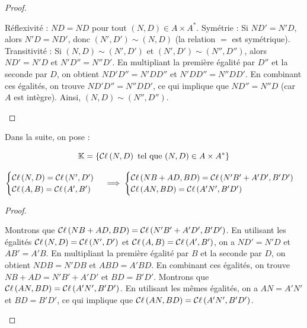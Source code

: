 \documentclass[12pt, a4paper]{report}
\begin{document}
\begin{proof}
    \begin{outline}
        \1 Réflexivité : $ND = ND$ pour tout $(N, D) \in A \times A^*$.
        \1 Symétrie : Si $ND' = N'D$, alors $N'D = ND'$, donc $(N', D') \sim (N, D)$ (la relation $=$ est symétrique).
        \1 Transitivité :
        \2 Si $(N, D) \sim (N', D')$ et $(N', D') \sim (N'', D'')$, alors $ND' = N'D$ et $N'D'' = N''D'$.
        \2 En multipliant la première égalité par $D''$ et la seconde par $D$, on obtient $ND'D'' = N'DD''$ et $N'DD'' = N''DD'$.
        \2 En combinant ces égalités, on trouve $ND'D'' = N''DD'$, ce qui implique que $ND'' = N''D$ (car $A$ est intègre).
        \2 Ainsi, $(N, D) \sim (N'', D'')$.
    \end{outline}
\end{proof}

\begin{definition}
    Dans la suite, on pose :

    $$\mathbb{K} = \{ \mathcal{C}\ell\left(N, D\right) \text{ tel que } (N, D) \in A \times A^* \}$$
\end{definition}

\begin{property}
    $$\begin{cases}
    \mathcal{C}\ell\left(N,D\right) = \mathcal{C}\ell\left(N', D'\right)\\
    \mathcal{C}\ell\left(A,B\right) = \mathcal{C}\ell\left(A', B'\right)
    \end{cases}
    \implies
    \begin{cases}
    \mathcal{C}\ell\left(NB + AD, BD\right) = \mathcal{C}\ell\left(N'B' + A'D', B'D'\right)\\
    \mathcal{C}\ell\left(AN,BD\right) = \mathcal{C}\ell\left(A'N', B'D'\right)
    \end{cases}$$
\end{property}

\begin{proof}
    \begin{outline}
        \1 Montrons que $\mathcal{C}\ell\left(NB + AD, BD\right) = \mathcal{C}\ell\left(N'B' + A'D', B'D'\right)$.
        \2 En utilisant les égalités $\mathcal{C}\ell\left(N,D\right) = \mathcal{C}\ell\left(N', D'\right)$ et $\mathcal{C}\ell\left(A,B\right) = \mathcal{C}\ell\left(A', B'\right)$, on a $ND' = N'D$ et $AB' = A'B$.
        \2 En multipliant la première égalité par $B$ et la seconde par $D$, on obtient $NDB = N'DB$ et $ABD = A'BD$.
        \2 En combinant ces égalités, on trouve $NB + AD = N'B' + A'D'$ et $BD = B'D'$.
        \1 Montrons que $\mathcal{C}\ell\left(AN,BD\right) = \mathcal{C}\ell\left(A'N', B'D'\right)$.
        \1 En utilisant les mêmes égalités, on a $AN = A'N'$ et $BD = B'D'$, ce qui implique que $\mathcal{C}\ell\left(AN,BD\right) = \mathcal{C}\ell\left(A'N', B'D'\right)$.
    \end{outline}
\end{proof}
\end{document}
